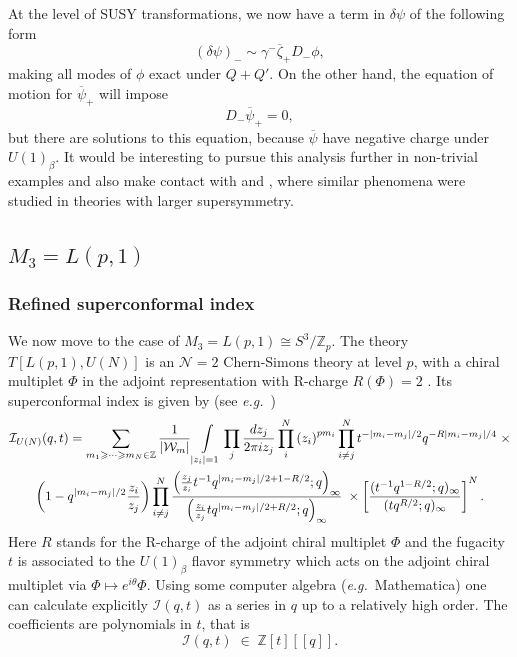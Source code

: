 \documentclass[hyper,letterpaper]{JHEP3}
\newcommand{\be}{\begin{equation}}
\newcommand{\ee}{\end{equation}}
\newcommand{\Z}{{\mathbb Z}}
\renewcommand{\bar}{\overline}
\def\CI{{\mathcal I}}
\def\CN{{\mathcal N}}
\def\eg{{\textit{e.g.}}}
\begin{document}
At the level of SUSY transformations, we now have a term in $\delta \psi$ of the following form
\be
(\delta \psi)_- \sim \gamma^-\bar{\zeta}_+ D_-\phi,
\ee
making all modes of $\phi$ exact under $Q+Q'$. On the other hand, the equation of motion for $\bar{\psi}_+$ will impose
\be
D_-\bar{\psi}_+=0,
\ee
but there are solutions to this equation, because $\bar{\psi}$ have negative charge under $U(1)_{\beta}$.
It would be interesting to pursue this analysis further in non-trivial examples and also make contact with \cite{Beem:2013sza} and \cite{Dedushenko:2016jxl},
where similar phenomena were studied in theories with larger supersymmetry.

\subsection{${M_3=L(p,1)}$}\label{sec:Lp1}

\subsubsection{Refined superconformal index}

We now move to the case of $M_3=L(p,1)\cong S^3/\Z_p$. The theory $T[L(p,1),U(N)]$ is an $\CN=2$ Chern-Simons theory at level $p$, with a chiral multiplet $\Phi$ in the adjoint representation with R-charge $R(\Phi)=2$ \cite{Gadde:2013sca,Chung:2014qpa, equivariant}. Its superconformal index is given by (see \eg~\cite{Imamura:2011su})
\begin{multline}
	\label{IndexInt}
{\CI}_{U(N)}(q,t) = \sum_{{m_1 \geqslant \cdots \geqslant m_N} \in \mathbb{Z}}  \frac{1}{\left| {\cal W}_m \right|} \int\limits_{|z_i|=1} \prod_j \frac{dz_j}{2\pi i z_j}  \prod_{i}^{N} \left( z_i \right)^{{ p}m_i} \prod_{i \neq j}^{N} t^{- \left| m_i -m_j \right|/2} q^{-R \left| m_i -m_j \right|/4}\;\times \\
\left( 1-q^{ \left| m_i -m_j \right|/2} \frac{z_i}{z_j} \right)
\prod_{i \neq j}^{N} \frac{\left( \frac{z_j}{z_i} t^{-1} q^{ \left| m_i -m_j \right|/2+1-R/2}; q \right)_{\infty}}{\left( \frac{z_i}{z_j} t q^{ \left| m_i -m_j \right|/2+R/2}; q \right)_{\infty}} \;\times  \left[\frac{(t^{-1}q^{1-R/2}; q)_{\infty}}{(t q^{R/2}; q)_{\infty}}\right]^N.
\end{multline}
Here $R$ stands for the R-charge of the adjoint chiral multiplet $\Phi$ and the fugacity $t$ is associated to the $U(1)_{\beta}$ flavor symmetry which acts on the adjoint chiral multiplet via $\Phi\mapsto e^{i\theta}\Phi$. Using some computer algebra (\eg~Mathematica) one can calculate explicitly $\CI(q,t)$ as a series in $q$ up to a relatively high order. The coefficients are polynomials in $t$, that is
\begin{equation}
  \CI(q,t)\;\in\;\Z[t][[q]].
\end{equation}
\end{document}
